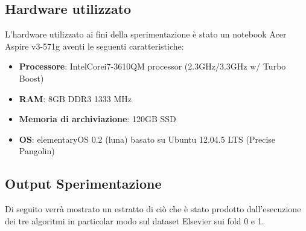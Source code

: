\subsection{Hardware utilizzato}
\label{hw}
L'hardware utilizzato ai fini della sperimentazione è stato un notebook Acer Aspire v3-571g aventi le seguenti caratteristiche:
\begin{itemize}
	\item \textbf{Processore}: Intel\textregistered Core\texttrademark  i7-3610QM processor (2.3GHz/3.3GHz w/ Turbo Boost)
	\item \textbf{RAM}: 8GB DDR3 1333 MHz
	\item \textbf{Memoria di archiviazione}: 120GB SSD
	\item \textbf{OS}: elementaryOS 0.2 (luna) basato su Ubuntu 12.04.5 LTS (Precise Pangolin)
\end{itemize}

\subsection{Output Sperimentazione}
Di seguito verrà mostrato un estratto di ciò che è stato prodotto dall'esecuzione dei tre algoritmi in particolar modo sul dataset Elsevier sui fold 0 e 1.
